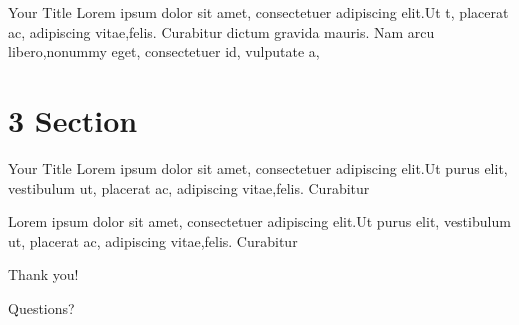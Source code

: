 \documentclass[aspectratio  =  169, 15pt]{beamer}
\begin{document}
    \begin{frame}{Your Title}
        Lorem ipsum dolor sit amet, consectetuer adipiscing elit.Ut t, placerat ac, adipiscing vitae,felis. Curabitur dictum gravida mauris. Nam arcu libero,nonummy eget, consectetuer id, vulputate a,
    \end{frame}
    
    \section{3 Section}
    
    \begin{frame}{Your Title}
        Lorem ipsum dolor sit amet, consectetuer adipiscing elit.Ut purus elit, vestibulum ut, placerat ac, adipiscing vitae,felis. Curabitur
    \end{frame}
    
    \begin{frame}
        Lorem ipsum dolor sit amet, consectetuer adipiscing elit.Ut purus elit, vestibulum ut, placerat ac, adipiscing vitae,felis. Curabitur
    \end{frame}
    
    
    \begin{frame}[standout]
        \normalfont
        \vspace*{2.25cm}
        \Huge Thank you!
        
        \vspace*{0.625cm}
        Questions?
        \vspace*{0.125cm}
        \begin{columns}[t]
            
                \vspace*{0.2cm}
                \centering\normalsize\break\myauthor
                
                \vspace*{-0.9cm}
                \begin{flushright}
                    \large\textbf{\textsc{\break\mydocumenttitle}}
                \end{flushright}
                
             \scriptsize\normalfont\break\mydocumentsubtitle
                
        \end{columns}
    \end{frame}
\end{document}
